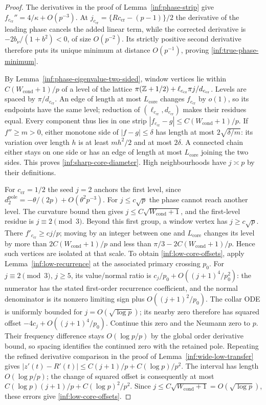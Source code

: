 \begin{proof}
The derivatives in the proof of Lemma~\ref{inf:phase-strip} give
$f_{c_{\mathrm{cr}}}''=4/\kappa+O(p^{-3})$. At
$j_{c_{\mathrm{cr}}}=\{Rc_{\mathrm{cr}}-(p-1)\}/2$ the derivative of the leading phase cancels
the added linear term, while the corrected derivative is
$-2b_\nu/(1+b^2)<0$, of size $O(p^{-2})$.
Its strictly positive second derivative
therefore puts its unique minimum at distance $O(p^{-1})$, proving
\eqref{inf:true-phase-minimum}.

By Lemma~\ref{inf:phase-eigenvalue-two-sided}, window vertices lie
within $C(W_{\mathrm{cond}}+1)/p$ of a level of the lattice
$\pi(\mathbb{Z}+1/2)+\ell_{c_{\mathrm{cr}}}\pi j/d_{c_{\mathrm{cr}}}$.
Levels are spaced by $\pi/d_{c_{\mathrm{cr}}}$.
An edge of length at most $L_{\mathrm{core}}$ changes $f_{c_{\mathrm{cr}}}$ by
$o(1)$, so its endpoints have the same level; reduction of
$(\ell_{c_{\mathrm{cr}}},d_{c_{\mathrm{cr}}})$ makes their residues equal.
Every component thus lies in one strip
$|f_{c_{\mathrm{cr}}}-g|\le C(W_{\mathrm{cond}}+1)/p$.
If $f''\ge m>0$, either monotone side of $|f-g|\le\delta$
has length at most $2\sqrt{\delta/m}$: its variation over length
$h$ is at least $mh^2/2$ and at most $2\delta$.
A connected chain either stays on one side or has an edge of
length at most $L_{\mathrm{core}}$ joining the two sides.
This proves \eqref{inf:sharp-core-diameter}. High neighbourhoods
have $j\asymp p$ by their definitions.

For $c_{\mathrm{cr}}=1/2$ the seed $j=2$ anchors the first level, since
$d_2^{\mathrm{pole}}=-\theta/(2p)+O(\theta^2p^{-3})$.
For $j\le c\sqrt p$ the phase cannot reach another level.
The curvature bound then gives $j\le C\sqrt{W_{\mathrm{cond}}+1}$,
and the first-level residue is $j\equiv2\pmod3$.
Beyond this first group, a window vertex has $j\ge c\sqrt p$.
There $f'_{c_{\mathrm{cr}}}\ge cj/p$; moving by an integer between one and
$L_{\mathrm{core}}$ changes its level by more than
$2C(W_{\mathrm{cond}}+1)/p$ and less than
$\pi/3-2C(W_{\mathrm{cond}}+1)/p$.
Hence such vertices are isolated at that scale.
To obtain \eqref{inf:low-core-offsets}, apply
Lemma~\ref{inf:low-recurrence} at the associated primary crossing
$p_0$. For $j\equiv2\pmod3$, $j\ge5$, its value/normal ratio is
$c_j/p_0+O((j+1)^4/p_0^2)$: the numerator has the stated
first-order recurrence coefficient, and the normal denominator
is its nonzero limiting sign plus $O((j+1)^2/p_0)$.
The collar ODE is uniformly bounded for
$j=O(\sqrt{\log p})$; its nearby zero therefore has squared
offset $-4c_j+O((j+1)^4/p_0)$.
Continue this zero and the Neumann zero to $p$.
Their frequency difference stays $O(\log p/p)$ by the global
order derivative bound, so spacing identifies the continued zero
with the retained pole. Repeating the refined derivative comparison
in the proof of Lemma~\ref{inf:wide-low-transfer} gives
$|z'(t)-R'(t)|\le C(j+1)/p+C(\log p)/p^2$.
The interval has length $O(\log p/p)$; the change of squared
offset is consequently at most
$C(\log p)(j+1)/p+C(\log p)^2/p^2$.
Since $j\le C\sqrt{W_{\mathrm{cond}}+1}=O(\sqrt{\log p})$,
these errors give \eqref{inf:low-core-offsets}.
\end{proof}

